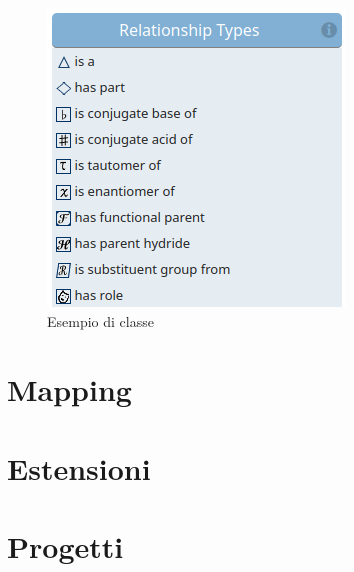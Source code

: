 \documentclass[12pt,a4paper,openright,twoside]{book}
\begin{document}
\begin{figure}[H]
	\centering
	\includegraphics[width=\linewidth]{figures/relationship-types.png}
	\caption{Esempio di classe}
	\label{fig:RelationshipTypes}
\end{figure}

\chapter{Mapping}
\label{chap:mapping}

\chapter{Estensioni}
\label{chap:extensions}

\chapter{Progetti}
\label{chap:projects}
\end{document}
